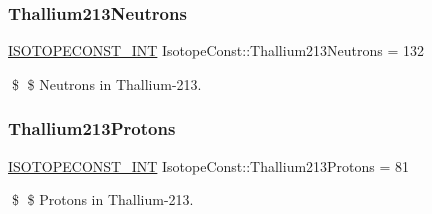 \subsubsection{\texorpdfstring{Thallium213\+Neutrons}{Thallium213Neutrons}}
{\footnotesize\ttfamily \mbox{\hyperlink{group___isotope_const-_macros_ga5f18360b3e99483a35c32d789e62621c}{I\+S\+O\+T\+O\+P\+E\+C\+O\+N\+S\+T\+\_\+\+I\+NT}} Isotope\+Const\+::\+Thallium213\+Neutrons = 132}

\$ \$ Neutrons in Thallium-\/213. \mbox{\label{group___isotope_const-_thallium-_tl213_gaa53efd24c97c17ab86cdb7e43cdb7f6d}} 
\subsubsection{\texorpdfstring{Thallium213\+Protons}{Thallium213Protons}}
{\footnotesize\ttfamily \mbox{\hyperlink{group___isotope_const-_macros_ga5f18360b3e99483a35c32d789e62621c}{I\+S\+O\+T\+O\+P\+E\+C\+O\+N\+S\+T\+\_\+\+I\+NT}} Isotope\+Const\+::\+Thallium213\+Protons = 81}

\$ \$ Protons in Thallium-\/213. 